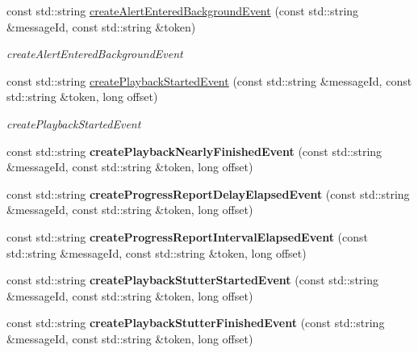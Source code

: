 \begin{DoxyCompactItemize}
const std\+::string \hyperlink{classAVSJson_1_1JsonFactory_a650bd9287a8cc3975ec510f7c816c1d8}{create\+Alert\+Entered\+Background\+Event} (const std\+::string \&message\+Id, const std\+::string \&token)
\begin{DoxyCompactList}\small\item\em create\+Alert\+Entered\+Background\+Event \end{DoxyCompactList}\item 
const std\+::string \hyperlink{classAVSJson_1_1JsonFactory_a6ad69e447a84fe222b0b318cf5e1f74d}{create\+Playback\+Started\+Event} (const std\+::string \&message\+Id, const std\+::string \&token, long offset)
\begin{DoxyCompactList}\small\item\em create\+Playback\+Started\+Event \end{DoxyCompactList}\item 
\mbox{\label{classAVSJson_1_1JsonFactory_a939227104c9aeb3bd490a7a6a3822469}} 
const std\+::string {\bfseries create\+Playback\+Nearly\+Finished\+Event} (const std\+::string \&message\+Id, const std\+::string \&token, long offset)
\item 
\mbox{\label{classAVSJson_1_1JsonFactory_a32ef237f77b9065dcb711e95810522e3}} 
const std\+::string {\bfseries create\+Progress\+Report\+Delay\+Elapsed\+Event} (const std\+::string \&message\+Id, const std\+::string \&token, long offset)
\item 
\mbox{\label{classAVSJson_1_1JsonFactory_ad57a9016772ea36d9782544bc6e3aead}} 
const std\+::string {\bfseries create\+Progress\+Report\+Interval\+Elapsed\+Event} (const std\+::string \&message\+Id, const std\+::string \&token, long offset)
\item 
\mbox{\label{classAVSJson_1_1JsonFactory_a83e17b2b8c7ff1b81118b38078339818}} 
const std\+::string {\bfseries create\+Playback\+Stutter\+Started\+Event} (const std\+::string \&message\+Id, const std\+::string \&token, long offset)
\item 
\mbox{\label{classAVSJson_1_1JsonFactory_a62362b2b370767469345b9aef0ee60d3}} 
const std\+::string {\bfseries create\+Playback\+Stutter\+Finished\+Event} (const std\+::string \&message\+Id, const std\+::string \&token, long offset)

\end{DoxyCompactItemize}

